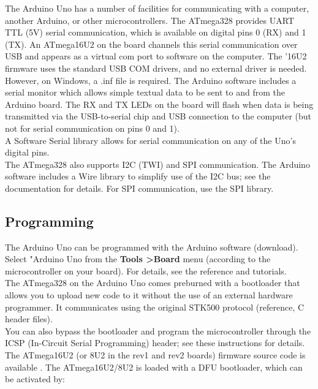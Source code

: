 \documentclass[a4paper, 12pt, notitlepage]{report}
\begin{document}
The Arduino Uno has a number of facilities for communicating with a computer, another Arduino, or other microcontrollers. The ATmega328 provides UART TTL (5V) serial communication, which is available on digital pins 0 (RX) and 1 (TX). An ATmega16U2 on the board channels this serial communication over USB and appears as a virtual com port to software on the computer. The '16U2 firmware uses the standard USB COM drivers, and no external driver is needed. However, on Windows, a .inf file is required. The Arduino software includes a serial monitor which allows simple textual data to be sent to and from the Arduino board. The RX and TX LEDs on the board will flash when data is being transmitted via the USB-to-serial chip and USB connection to the computer (but not for serial communication on pins 0 and 1).\\

A Software Serial library allows for serial communication on any of the Uno's digital pins.\\

The ATmega328 also supports I2C (TWI) and SPI communication. The Arduino software includes a Wire library to simplify use of the I2C bus; see the documentation for details. For SPI communication, use the SPI library.\\

\subsection{Programming}

The Arduino Uno can be programmed with the Arduino software (download). Select "Arduino Uno from the \textbf{Tools \textgreater Board} menu (according to the microcontroller on your board). For details, see the reference and tutorials.\\

The ATmega328 on the Arduino Uno comes preburned with a bootloader that allows you to upload new code to it without the use of an external hardware programmer. It communicates using the original STK500 protocol (reference, C header files).\\

You can also bypass the bootloader and program the microcontroller through the ICSP (In-Circuit Serial Programming) header; see these instructions for details.\\

The ATmega16U2 (or 8U2 in the rev1 and rev2 boards) firmware source code is available . The ATmega16U2/8U2 is loaded with a DFU bootloader, which can be activated by:\\
\end{document}
